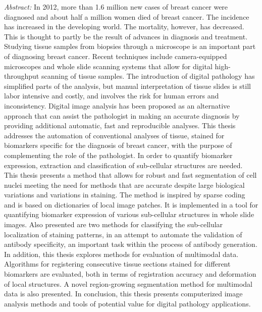 {\begin{enumerate}
{\em Abstract:} In 2012, more than 1.6 million new cases of breast cancer were diagnosed and about half a million women died of breast cancer. The incidence has increased in the developing world. The mortality, however, has decreased. This is thought to partly be the result of advances in diagnosis and treatment. Studying tissue samples from biopsies through a microscope is an important part of diagnosing breast cancer. Recent techniques include camera-equipped microscopes and whole slide scanning systems that allow for digital high-throughput scanning of tissue samples. The introduction of digital pathology has simplified parts of the analysis, but manual interpretation of tissue slides is still labor intensive and costly, and involves the risk for human errors and inconsistency. Digital image analysis has been proposed as an alternative approach that can assist the pathologist in making an accurate diagnosis by providing additional automatic, fast and reproducible analyses. This thesis addresses the automation of conventional analyses of tissue, stained for biomarkers specific for the diagnosis of breast cancer, with the purpose of complementing the role of the pathologist. In order to quantify biomarker expression, extraction and classification of sub-cellular structures are needed. This thesis presents a method that allows for robust and fast segmentation of cell nuclei meeting the need for methods that are accurate despite large biological variations and variations in staining. The method is inspired by sparse coding and is based on dictionaries of local image patches. It is implemented in a tool for quantifying biomarker expression of various sub-cellular structures in whole slide images. Also presented are two methods for classifying the sub-cellular localization of staining patterns, in an attempt to automate the validation of antibody specificity, an important task within the process of antibody generation.  In addition, this thesis explores methods for evaluation of multimodal data. Algorithms for registering consecutive tissue sections stained for different biomarkers are evaluated, both in terms of registration accuracy and deformation of local structures. A novel region-growing segmentation method for multimodal data is also presented. In conclusion, this thesis presents computerized image analysis methods and tools of potential value for digital pathology applications.


\end{enumerate}}
